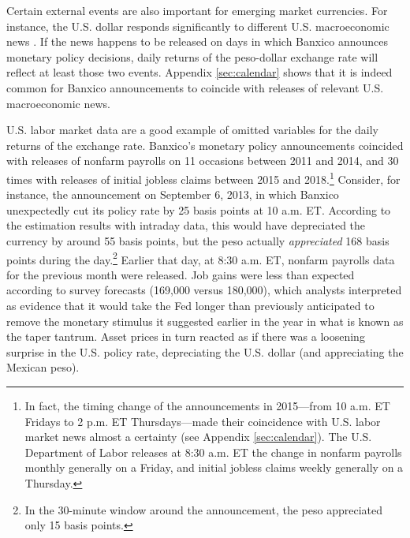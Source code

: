 Certain external events are also important for emerging market currencies. For instance, the U.S. dollar responds significantly to different U.S. macroeconomic news \parencite{ABDV:2003,FRWW:2007}. If the news happens to be released on days in which Banxico announces monetary policy decisions, daily returns of the peso-dollar exchange rate will reflect at least those two events. Appendix \ref{sec:calendar} shows that it is indeed common for Banxico announcements to coincide with releases of relevant U.S. macroeconomic news.

U.S. labor market data are a good example of omitted variables for the daily returns of the exchange rate. Banxico's monetary policy announcements coincided with releases of nonfarm payrolls on 11 occasions between 2011 and 2014, and 30 times with releases of initial jobless claims between 2015 and 2018.\footnote{In fact, the timing change of the announcements in 2015---from 10 a.m. ET Fridays to 2 p.m. ET Thursdays---made their coincidence with U.S. labor market news almost a certainty (see Appendix \ref{sec:calendar}). The U.S. Department of Labor releases at 8:30 a.m. ET the change in nonfarm payrolls monthly generally on a Friday, and initial jobless claims weekly generally on a Thursday.} 
Consider, for instance, the announcement on September 6, 2013, in which Banxico unexpectedly cut its policy rate by 25 basis points at 10 a.m. ET. According to the estimation results with intraday data, this would have depreciated the currency by around 55 basis points, but the peso actually \textit{appreciated} 168 basis points during the day.\footnote{ In the 30-minute window around the announcement, the peso appreciated only 15 basis points.} Earlier that day, at 8:30 a.m. ET, nonfarm payrolls data for the previous month were released. Job gains were less than expected according to survey forecasts (169,000 versus 180,000), which analysts interpreted as evidence that it would take the Fed longer than previously anticipated to remove the monetary stimulus it suggested earlier in the year in what is known as the taper tantrum. Asset prices in turn reacted as if there was a loosening surprise in the U.S. policy rate, depreciating the U.S. dollar (and appreciating the Mexican peso). 

